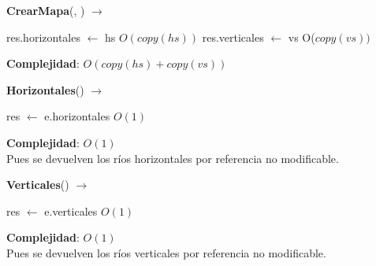 \begin{Algoritmos}

\begin{algorithm}[H]{\textbf{CrearMapa}(, ) $\to$ }
\begin{algorithmic}[1]
    \State res.horizontales $\gets$ hs \Comment $O(copy(hs))$
    \State res.verticales $\gets$ vs \Comment O($copy(vs))$
\end{algorithmic}
\textbf{Complejidad}: $O(copy(hs) + copy(vs))$
\end{algorithm}

\begin{algorithm}[H]{\textbf{Horizontales}() $\to$ }
\begin{algorithmic}[1]
    \State res $\gets$ e.horizontales \Comment $O(1)$
\end{algorithmic}
\textbf{Complejidad}: $O(1)$ \\
Pues se devuelven los ríos horizontales por referencia no modificable.
\end{algorithm}

\begin{algorithm}[H]{\textbf{Verticales}() $\to$ }
\begin{algorithmic}[1]
    \State res $\gets$ e.verticales \Comment $O(1)$
\end{algorithmic}
\textbf{Complejidad}: $O(1)$ \\
Pues se devuelven los ríos verticales por referencia no modificable.
\end{algorithm}

\end{Algoritmos}
